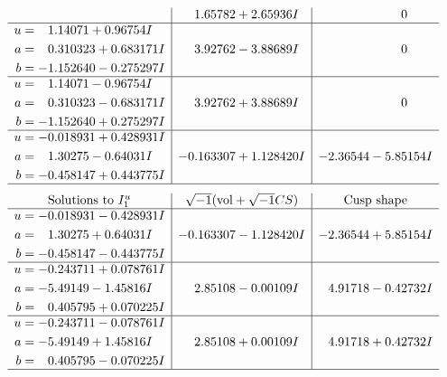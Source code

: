 \documentclass[1p]{elsarticle_modified}
\theoremstyle{definition}
\newcommand{\I}{\sqrt{-1}}
\begin{document}
$$\begin{array}{c|c|c}
 & \phantom{-}1.65782 + 2.65936 I & \phantom{-0.000000 } 0 \\ \hline\begin{aligned}
u &= \phantom{-}1.14071 + 0.96754 I \\
a &= \phantom{-}0.310323 + 0.683171 I \\
b &= -1.152640 - 0.275297 I\end{aligned}
 & \phantom{-}3.92762 - 3.88689 I & \phantom{-0.000000 } 0 \\ \hline\begin{aligned}
u &= \phantom{-}1.14071 - 0.96754 I \\
a &= \phantom{-}0.310323 - 0.683171 I \\
b &= -1.152640 + 0.275297 I\end{aligned}
 & \phantom{-}3.92762 + 3.88689 I & \phantom{-0.000000 } 0 \\ \hline\begin{aligned}
u &= -0.018931 + 0.428931 I \\
a &= \phantom{-}1.30275 - 0.64031 I \\
b &= -0.458147 + 0.443775 I\end{aligned}
 & -0.163307 + 1.128420 I & -2.36544 - 5.85154 I\\
 \hline 
 \end{array}$$\newpage$$\begin{array}{c|c|c}  
\text{Solutions to }I^u_{1}& \I (\text{vol} + \sqrt{-1}CS) & \text{Cusp shape}\\
 \hline 
\begin{aligned}
u &= -0.018931 - 0.428931 I \\
a &= \phantom{-}1.30275 + 0.64031 I \\
b &= -0.458147 - 0.443775 I\end{aligned}
 & -0.163307 - 1.128420 I & -2.36544 + 5.85154 I \\ \hline\begin{aligned}
u &= -0.243711 + 0.078761 I \\
a &= -5.49149 - 1.45816 I \\
b &= \phantom{-}0.405795 + 0.070225 I\end{aligned}
 & \phantom{-}2.85108 - 0.00109 I & \phantom{-}4.91718 - 0.42732 I \\ \hline\begin{aligned}
u &= -0.243711 - 0.078761 I \\
a &= -5.49149 + 1.45816 I \\
b &= \phantom{-}0.405795 - 0.070225 I\end{aligned}
 & \phantom{-}2.85108 + 0.00109 I & \phantom{-}4.91718 + 0.42732 I\\
 \hline 
 \end{array}$$\newpage\newpage\renewcommand{\arraystretch}{1}
\end{document}
